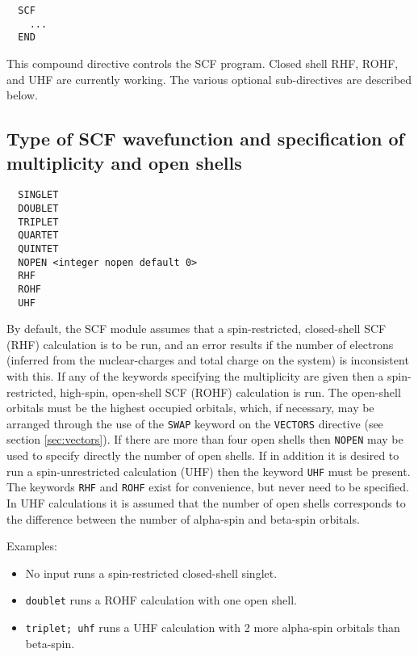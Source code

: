 \label{SCF}

\begin{verbatim}
  SCF
    ...
  END
\end{verbatim}

This compound directive controls the SCF program.  Closed shell RHF,
ROHF, and UHF are currently working.  The various optional
sub-directives are described below.

\subsection{Type of SCF wavefunction and specification of multiplicity
and open shells}

\begin{verbatim}
  SINGLET 
  DOUBLET 
  TRIPLET 
  QUARTET 
  QUINTET 
  NOPEN <integer nopen default 0>
  RHF
  ROHF
  UHF
\end{verbatim}

By default, the SCF module assumes that a spin-restricted,
closed-shell SCF (RHF) calculation is to be run, and an error results
if the number of electrons (inferred from the nuclear-charges and
total charge on the system) is inconsistent with this.  If any of the
keywords specifying the multiplicity are given then a spin-restricted,
high-spin, open-shell SCF (ROHF) calculation is run.  The open-shell
orbitals must be the highest occupied orbitals, which, if necessary,
may be arranged through the use of the \verb+SWAP+ keyword on the
\verb+VECTORS+ directive (see section \ref{sec:vectors}). If there are
more than four open shells then \verb+NOPEN+ may be used to specify
directly the number of open shells.  If in addition it is desired to
run a spin-unrestricted calculation (UHF) then the keyword \verb+UHF+
must be present.  The keywords \verb+RHF+ and \verb+ROHF+ exist for
convenience, but never need to be specified.  In UHF calculations it is
assumed that the number of open shells corresponds to the difference
between the number of alpha-spin and beta-spin orbitals.

Examples:
\begin{itemize}
\item No input runs a spin-restricted closed-shell singlet.
\item \verb+doublet+ runs a ROHF calculation with one open shell.
\item \verb+triplet; uhf+ runs a UHF calculation with 2 more
  alpha-spin orbitals than beta-spin.
\end{itemize}

